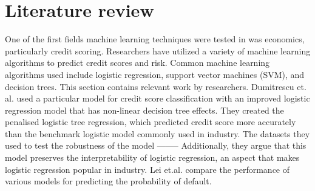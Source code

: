 \documentclass{article}
\begin{document}
\section*{Literature review}
One of the first fields machine learning techniques were tested in was economics,
particularly credit scoring. Researchers have utilized a variety of machine learning
algorithms to predict credit scores and risk. Common machine learning algorithms
used include logistic regression, support vector machines (SVM), and decision trees.
This section contains relevant work by researchers.
\vspace{5mm}\newline
Dumitrescu et. al. used a particular model for credit score classification with an 
improved logistic regression model that has non-linear decision tree effects. They created 
the penalised logistic tree regression, which predicted credit score 
more accurately than the benchmark logistic model commonly used in industry. The
datasets they used to test the robustness of the model --------
Additionally, they argue that this model preserves the interpretability of 
logistic regression, an aspect that makes logistic regression popular in industry. 
Lei et.al. compare the performance of various models for predicting the probability 
of default. 

\newpage
\end{document}
